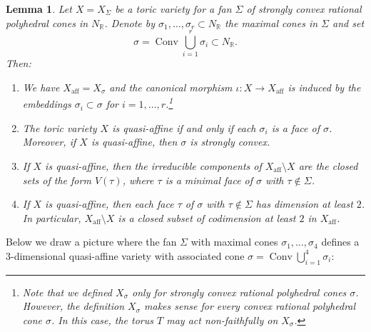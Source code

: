 \documentclass[JEP,XML,SOM,Unicode]{cedram}
\theoremstyle{plain}
\newtheorem{lemma}[theorem]{Lemma}
\theoremstyle{definition}
\DeclareMathOperator{\aff}{aff}
\DeclareMathOperator{\Conv}{Conv}
\newcommand{\RR}{\mathbb{R}}
\begin{document}
\begin{lemma}
\label{lem.toric_qusi-affine}
Let $X = X_{\Sigma}$ be a toric variety for a fan $\Sigma$ of strongly convex rational
polyhedral cones in $N_{\RR}$. Denote by $\sigma_1, \ldots, \sigma_r \subset N_{\RR}$
the maximal cones in $\Sigma$ and set
\[
\sigma = \Conv \bigcup_{i=1}^r \sigma_i \subset N_{\RR}.
\]
Then:
\begin{enumerate}
\item \label{lem.toric_qusi-affine1} We have $X_{\aff} = X_\sigma$
and the canonical morphism $\iota \colon X \to X_{\aff}$
is induced by the embeddings $\sigma_i \subset \sigma$ for $i=1, \ldots, r$.\footnote{Note that we defined $X_{\sigma}$ only for strongly convex rational polyhedral
cones $\sigma$. However, the definition $X_{\sigma}$ makes sense for every convex rational polyhedral
cone $\sigma$. In this case, the torus $T$ may act non-faithfully on $X_\sigma$.}
\item \label{lem.toric_qusi-affine2}
The toric variety $X$ is quasi-affine if and only if each $\sigma_i$ is a face of $\sigma$.
Moreover, if $X$ is quasi-affine, then $\sigma$ is strongly convex.
\item \label{lem.toric_qusi-affine3}
If $X$ is quasi-affine, then the irreducible components of $X_{\aff} \setminus X$ are the
closed sets of the form $V(\tau)$, where $\tau$ is a minimal face of $\sigma$ with $\tau \not\in \Sigma$.
\item \label{lem.toric_qusi-affine4}
If $X$ is quasi-affine, then each face $\tau$ of $\sigma$ with $\tau \not\in \Sigma$
has dimension at least $2$. In particular,
$X_{\aff} \setminus X$ is a closed subset of codimension at least $2$
in $X_{\aff}$.
\end{enumerate}
\end{lemma}

Below we draw a picture where the fan $\Sigma$ with maximal cones $\sigma_1, \ldots, \sigma_4$
defines a $3$-dimensional quasi-affine variety with associated cone
$\sigma = \Conv \bigcup_{i=1}^4 \sigma_i$:\vspace*{5pt}
\end{document}
